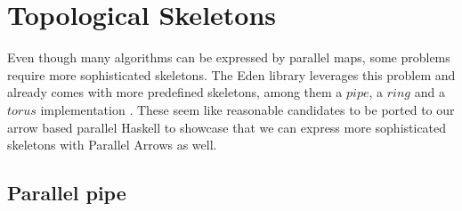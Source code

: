 \documentclass{jfp1}
\newcommand{\Varid}[1]{\mathit{#1}}
\renewcommand{\cite}[1]{\citep{#1}}
\begin{document}
\section{Topological Skeletons}
\label{sec:topology-skeletons}
Even though many algorithms can be expressed by parallel maps, some problems require more sophisticated skeletons. The Eden library leverages this problem and already comes with more predefined skeletons, among them a \ensuremath{\Varid{pipe}}, a \ensuremath{\Varid{ring}} and a \ensuremath{\Varid{torus}} implementation \cite{Loogen2012, eden_skel_topology}. These seem like reasonable candidates to be ported to our arrow based parallel Haskell to showcase that we can express more sophisticated skeletons with Parallel Arrows as well.

\subsection{Parallel pipe}
\end{document}
